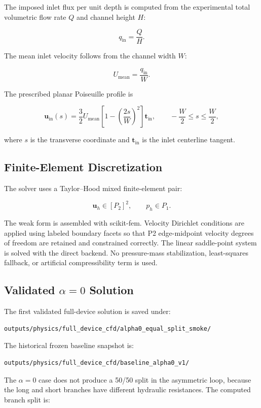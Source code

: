The imposed inlet flux per unit depth is computed from the experimental total
volumetric flow rate \(Q\) and channel height \(H\):

\[
q_{\mathrm{in}} = \frac{Q}{H}.
\]

The mean inlet velocity follows from the channel width \(W\):

\[
U_{\mathrm{mean}} = \frac{q_{\mathrm{in}}}{W}.
\]

The prescribed planar Poiseuille profile is

\[
\mathbf{u}_{\mathrm{in}}(s)
=
\frac{3}{2}U_{\mathrm{mean}}
\left[1-\left(\frac{2s}{W}\right)^2\right]\mathbf{t}_{\mathrm{in}},
\qquad
-\frac{W}{2}\le s\le \frac{W}{2},
\]

where \(s\) is the transverse coordinate and \(\mathbf{t}_{\mathrm{in}}\) is
the inlet centerline tangent.

\subsection{Finite-Element Discretization}

The solver uses a Taylor--Hood mixed finite-element pair:

\[
\mathbf{u}_h \in [P_2]^2,
\qquad
p_h \in P_1.
\]

The weak form is assembled with scikit-fem.  Velocity Dirichlet conditions are
applied using labeled boundary facets so that P2 edge-midpoint velocity degrees
of freedom are retained and constrained correctly.  The linear saddle-point
system is solved with the direct backend.  No pressure-mass stabilization,
least-squares fallback, or artificial compressibility term is used.

\subsection{Validated \(\alpha=0\) Solution}

The first validated full-device solution is saved under:

\begin{verbatim}
outputs/physics/full_device_cfd/alpha0_equal_split_smoke/
\end{verbatim}

The historical frozen baseline snapshot is:

\begin{verbatim}
outputs/physics/full_device_cfd/baseline_alpha0_v1/
\end{verbatim}

The \(\alpha=0\) case does not produce a 50/50 split in the asymmetric loop,
because the long and short branches have different hydraulic resistances.  The
computed branch split is:

